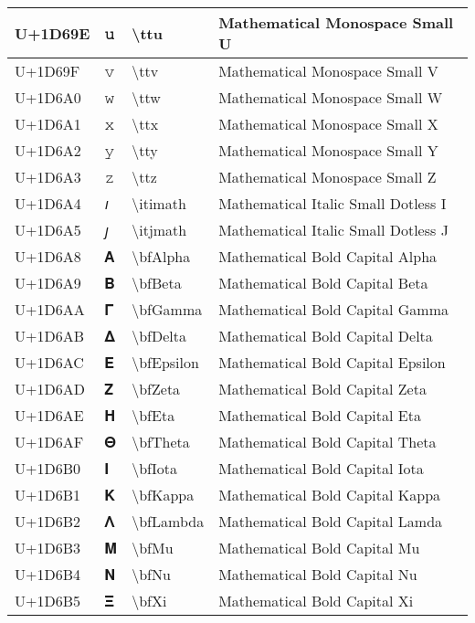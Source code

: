 \begin{table}[h]
\begin{tabulary}{\linewidth}{|L|L|L|L|}
\hline
U+1D69E & 𝚞 & {\textbackslash}ttu & Mathematical Monospace Small U \\
\hline
U+1D69F & 𝚟 & {\textbackslash}ttv & Mathematical Monospace Small V \\
\hline
U+1D6A0 & 𝚠 & {\textbackslash}ttw & Mathematical Monospace Small W \\
\hline
U+1D6A1 & 𝚡 & {\textbackslash}ttx & Mathematical Monospace Small X \\
\hline
U+1D6A2 & 𝚢 & {\textbackslash}tty & Mathematical Monospace Small Y \\
\hline
U+1D6A3 & 𝚣 & {\textbackslash}ttz & Mathematical Monospace Small Z \\
\hline
U+1D6A4 & 𝚤 & {\textbackslash}itimath & Mathematical Italic Small Dotless I \\
\hline
U+1D6A5 & 𝚥 & {\textbackslash}itjmath & Mathematical Italic Small Dotless J \\
\hline
U+1D6A8 & 𝚨 & {\textbackslash}bfAlpha & Mathematical Bold Capital Alpha \\
\hline
U+1D6A9 & 𝚩 & {\textbackslash}bfBeta & Mathematical Bold Capital Beta \\
\hline
U+1D6AA & 𝚪 & {\textbackslash}bfGamma & Mathematical Bold Capital Gamma \\
\hline
U+1D6AB & 𝚫 & {\textbackslash}bfDelta & Mathematical Bold Capital Delta \\
\hline
U+1D6AC & 𝚬 & {\textbackslash}bfEpsilon & Mathematical Bold Capital Epsilon \\
\hline
U+1D6AD & 𝚭 & {\textbackslash}bfZeta & Mathematical Bold Capital Zeta \\
\hline
U+1D6AE & 𝚮 & {\textbackslash}bfEta & Mathematical Bold Capital Eta \\
\hline
U+1D6AF & 𝚯 & {\textbackslash}bfTheta & Mathematical Bold Capital Theta \\
\hline
U+1D6B0 & 𝚰 & {\textbackslash}bfIota & Mathematical Bold Capital Iota \\
\hline
U+1D6B1 & 𝚱 & {\textbackslash}bfKappa & Mathematical Bold Capital Kappa \\
\hline
U+1D6B2 & 𝚲 & {\textbackslash}bfLambda & Mathematical Bold Capital Lamda \\
\hline
U+1D6B3 & 𝚳 & {\textbackslash}bfMu & Mathematical Bold Capital Mu \\
\hline
U+1D6B4 & 𝚴 & {\textbackslash}bfNu & Mathematical Bold Capital Nu \\
\hline
U+1D6B5 & 𝚵 & {\textbackslash}bfXi & Mathematical Bold Capital Xi \\

\end{tabulary}
\end{table}
